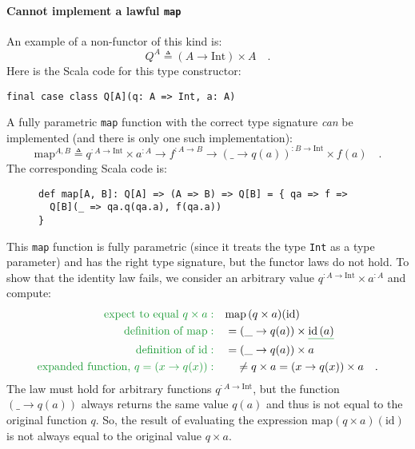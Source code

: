 \paragraph{Cannot implement a lawful \texttt{map}}

An example of a non-functor of this kind is:
\[
Q^{A}\triangleq\left(A\rightarrow\text{Int}\right)\times A\quad.
\]
Here is the Scala code for this type constructor:
\begin{lstlisting}
final case class Q[A](q: A => Int, a: A)
\end{lstlisting}
A fully parametric \lstinline!map! function with the correct type
signature \emph{can} be implemented (and there is only one such implementation):
\[
\text{map}^{A,B}\triangleq q^{:A\rightarrow\text{Int}}\times a^{:A}\rightarrow f^{:A\rightarrow B}\rightarrow(\_\rightarrow q(a))^{:B\rightarrow\text{Int}}\times f(a)\quad.
\]
The corresponding Scala code is:

\begin{wrapfigure}{l}{0.55\columnwidth}%
\vspace{-0.6\baselineskip}

\begin{lstlisting}
def map[A, B]: Q[A] => (A => B) => Q[B] = { qa => f =>
  Q[B](_ => qa.q(qa.a), f(qa.a)) 
}
\end{lstlisting}
\vspace{-0.8\baselineskip}
\end{wrapfigure}%

\noindent This \lstinline!map! function is fully parametric (since
it treats the type \lstinline!Int! as a type parameter) and has the
right type signature, but the functor laws do not hold. To show that
the identity law fails, we consider an arbitrary value $q^{:A\rightarrow\text{Int}}\times a^{:A}$
and compute:
\begin{align*}
{\color{greenunder}\text{expect to equal }q\times a:}\quad & \text{map}\,(q\times a)(\text{id})\\
{\color{greenunder}\text{definition of }\text{map}:}\quad & =(\_\rightarrow q(a))\times\gunderline{\text{id}\,(a)}\\
{\color{greenunder}\text{definition of }\text{id}:}\quad & =(\_\rightarrow q(a))\times a\\
{\color{greenunder}\text{expanded function, }q=\left(x\rightarrow q(x)\right):}\quad & \quad\neq q\times a=(x\rightarrow q(x))\times a\quad.
\end{align*}
The law must hold for arbitrary functions $q^{:A\rightarrow\text{Int}}$,
but the function $\left(\_\rightarrow q(a)\right)$ always returns
the same value $q(a)$ and thus is not equal to the original function
$q$. So, the result of evaluating the expression $\text{map}(q\times a)(\text{id})$
is not always equal to the original value $q\times a$. 

